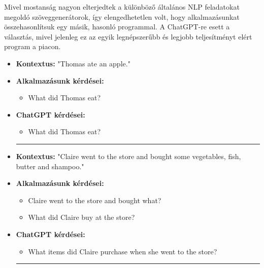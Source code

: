 Mivel mostanság nagyon elterjedtek a különböző általános NLP feladatokat megoldó szöveggenerátorok, így elengedhetetlen volt, hogy alkalmazásunkat összehasonlítsuk egy másik, hasonló programmal. A ChatGPT-re esett a választás, mivel jelenleg ez az egyik legnépszerűbb és legjobb teljesítményt elért program a piacon.
\begin{itemize}
\item \textbf{Kontextus:} "Thomas ate an apple."
\item \textbf{Alkalmazásunk kérdései:} 
	\begin{itemize}
		\item What did Thomas eat?
	\end{itemize}
\item \textbf{ChatGPT kérdései:} 
	\begin{itemize}
		\item What did Thomas eat?
	\end{itemize}

\hrule

\item \textbf{Kontextus:} "Claire went to the store and bought some vegetables, fish, butter and shampoo."
\item \textbf{Alkalmazásunk kérdései:} 
	\begin{itemize}
		\item Claire went to the store and bought what?
		\item What did Claire buy at the store?
	\end{itemize}
\item \textbf{ChatGPT kérdései:} 
	\begin{itemize}
		\item What items did Claire purchase when she went to the store?
	\end{itemize}
	
\hrule	
	

\end{itemize}
